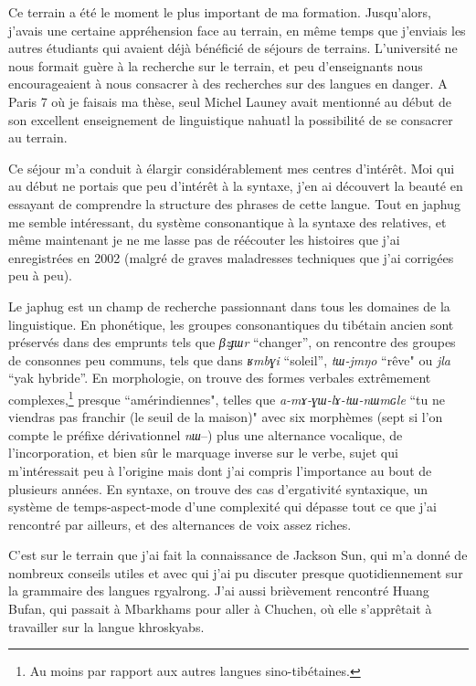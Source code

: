 \documentclass[oldfontcommands,oneside,a4paper,11pt]{memoir}
\begin{document}
 Ce terrain a été le moment le plus important de ma formation. Jusqu'alors, j'avais une certaine appréhension face au terrain, en même temps que j'enviais les autres étudiants qui avaient déjà bénéficié de séjours de terrains. L'université ne nous formait guère à la recherche sur le terrain, et peu d'enseignants nous encourageaient à nous consacrer à des recherches sur des langues en danger. A Paris 7 où je faisais ma thèse, seul Michel Launey avait mentionné au début de son excellent enseignement de linguistique nahuatl la possibilité de se consacrer au terrain. 

Ce séjour  m'a conduit à élargir considérablement mes centres d'intérêt. Moi qui au début ne portais que peu d'intérêt à la syntaxe, j'en ai découvert la beauté en essayant de comprendre la structure des phrases de cette langue. Tout en japhug me semble intéressant, du système consonantique à la syntaxe des relatives, et même maintenant je ne me lasse pas de réécouter les histoires que j'ai enregistrées en 2002   (malgré de graves maladresses techniques que j'ai corrigées peu à peu).  

Le japhug est un champ  de recherche passionnant dans tous les domaines de la linguistique.   En phonétique, les   groupes consonantiques du tibétain ancien sont préservés dans des emprunts tels que \textit{βzɟɯr} ``changer'', on rencontre des groupes de consonnes peu communs, tels que dans \textit{ʁmbɣi} ``soleil'',   \textit{tɯ-jmŋo} ``rêve" ou \textit{jla} ``yak hybride''. En morphologie, on trouve des formes verbales extrêmement complexes,\footnote{Au moins par rapport aux autres langues sino-tibétaines.} presque ``amérindiennes", telles que \textit{a-mɤ-ɣɯ-lɤ-tɯ-nɯmɢle} ``tu ne viendras pas franchir (le seuil de la maison)" avec six morphèmes (sept si l'on compte le préfixe dérivationnel \textit{nɯ}--) plus une alternance vocalique,  de l'incorporation, et bien sûr le marquage inverse sur le verbe, sujet qui   m'intéressait peu à l'origine mais dont j'ai compris l'importance au bout de plusieurs années. En syntaxe, on trouve des cas d'ergativité syntaxique, un système de temps-aspect-mode d'une complexité qui dépasse tout ce que j'ai rencontré par ailleurs, et des alternances de voix assez riches.

 

C'est sur le terrain que j'ai fait la connaissance de Jackson Sun, qui m'a donné de nombreux conseils utiles et avec qui j'ai pu discuter presque quotidiennement sur la grammaire des langues rgyalrong. J'ai aussi brièvement rencontré Huang Bufan, qui passait à Mbarkhams pour aller à Chuchen, où elle s'apprêtait à travailler sur la langue khroskyabs.
\end{document}
